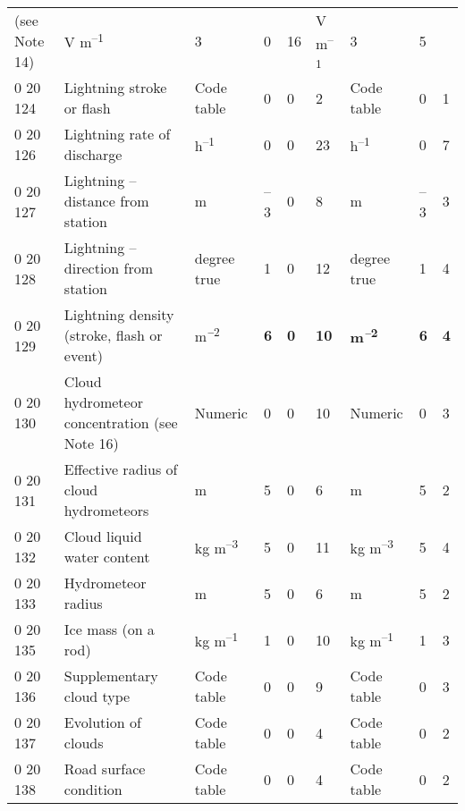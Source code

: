 \begin{longtable}[]{@{}lllllllll@{}}
\begin{minipage}[t]{0.08\columnwidth}
(see Note 14)\strut
\end{minipage} & \begin{minipage}[t]{0.08\columnwidth}\raggedright
V m\textsuperscript{--1}\strut
\end{minipage} & \begin{minipage}[t]{0.08\columnwidth}\raggedright
3\strut
\end{minipage} & \begin{minipage}[t]{0.08\columnwidth}\raggedright
0\strut
\end{minipage} & \begin{minipage}[t]{0.08\columnwidth}\raggedright
16\strut
\end{minipage} & \begin{minipage}[t]{0.08\columnwidth}\raggedright
V m\textsuperscript{--1}\strut
\end{minipage} & \begin{minipage}[t]{0.08\columnwidth}\raggedright
3\strut
\end{minipage} & \begin{minipage}[t]{0.08\columnwidth}\raggedright
5\strut
\end{minipage}\tabularnewline
0 20 124 & Lightning stroke or flash & Code table & 0 & 0 & 2 & Code table & 0 & 1\tabularnewline
0 20 126 & Lightning rate of discharge & h\textsuperscript{--1} & 0 & 0 & 23 & h\textsuperscript{--1} & 0 & 7\tabularnewline
0 20 127 & Lightning -- distance from station & m & --3 & 0 & 8 & m & --3 & 3\tabularnewline
0 20 128 & Lightning -- direction from station & degree true & 1 & 0 & 12 & degree true & 1 & 4\tabularnewline
0 20 129 & Lightning density (stroke, flash or event) & m\textsuperscript{\emph{\textbf{--}}2} & \textbf{6} & \textbf{0} & \textbf{10} & \textbf{m\textsuperscript{\emph{--}2}} & \textbf{6} & \textbf{4}\tabularnewline
0 20 130 & Cloud hydrometeor concentration (see Note 16) & Numeric & 0 & 0 & 10 & Numeric & 0 & 3\tabularnewline
0 20 131 & Effective radius of cloud hydrometeors & m & 5 & 0 & 6 & m & 5 & 2\tabularnewline
0 20 132 & Cloud liquid water content & kg m\textsuperscript{--3} & 5 & 0 & 11 & kg m\textsuperscript{--3} & 5 & 4\tabularnewline
0 20 133 & Hydrometeor radius & m & 5 & 0 & 6 & m & 5 & 2\tabularnewline
0 20 135 & Ice mass (on a rod) & kg m\textsuperscript{--1} & 1 & 0 & 10 & kg m\textsuperscript{--1} & 1 & 3\tabularnewline
0 20 136 & Supplementary cloud type & Code table & 0 & 0 & 9 & Code table & 0 & 3\tabularnewline
0 20 137 & Evolution of clouds & Code table & 0 & 0 & 4 & Code table & 0 & 2\tabularnewline
0 20 138 & Road surface condition & Code table & 0 & 0 & 4 & Code table & 0 & 2\tabularnewline
\bottomrule
\end{longtable}

